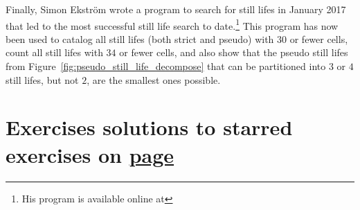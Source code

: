 Finally, Simon Ekström wrote a program to search for still lifes in January 2017 that led to the most successful still life search to date.\footnote{His program is available online at } This program has now been used to catalog all still lifes (both strict and pseudo) with $30$ or fewer cells, count all still lifes with $34$ or fewer cells, and also show that the pseudo still lifes from Figure~\ref{fig:pseudo_still_life_decompose} that can be partitioned into $3$ or $4$ still lifes, but not $2$, are the smallest ones possible.


\section*{Exercises \hfill \normalfont\textsf{\small solutions to starred exercises on \hyperlink{solutions_still_lifes}{page \pageref{solutions_still_lifes}}}}
\label{sec:still_lifes_exercises}
